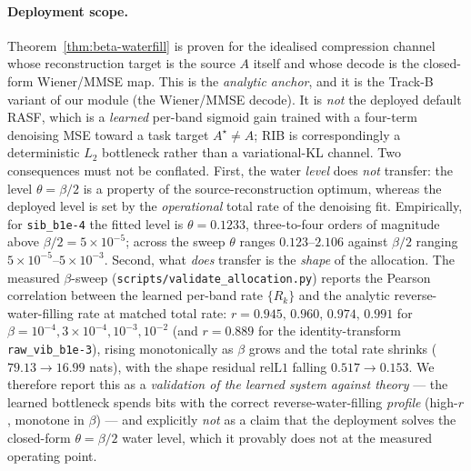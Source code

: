 \paragraph{Deployment scope.}
Theorem~\ref{thm:beta-waterfill} is proven for the idealised compression channel
whose reconstruction target is the source $A$ itself and whose decode is the
closed-form Wiener/MMSE map. This is the \emph{analytic anchor}, and it is the
Track-B variant of our module (the Wiener/MMSE decode). It is \emph{not} the
deployed default RASF, which is a \emph{learned} per-band sigmoid gain trained
with a four-term denoising MSE toward a task target $A^\star\!\neq\!A$; RIB is
correspondingly a deterministic $L_2$ bottleneck rather than a variational-KL
channel. Two consequences must not be conflated. First, the water \emph{level}
does \emph{not} transfer: the level $\theta=\beta/2$ is a property of the
source-reconstruction optimum, whereas the deployed level is set by the
\emph{operational} total rate of the denoising fit. Empirically, for
\texttt{sib\_b1e-4} the fitted level is $\theta=0.1233$, three-to-four orders of
magnitude above $\beta/2=5\times10^{-5}$; across the sweep $\theta$ ranges
$0.123$--$2.106$ against $\beta/2$ ranging $5\times10^{-5}$--$5\times10^{-3}$.
Second, what \emph{does} transfer is the \emph{shape} of the allocation. The
measured $\beta$-sweep (\texttt{scripts/validate\_allocation.py}) reports the
Pearson correlation between the learned per-band rate $\{R_k\}$ and the analytic
reverse-water-filling rate at matched total rate:
$r=0.945,\,0.960,\,0.974,\,0.991$ for
$\beta=10^{-4},3\!\times\!10^{-4},10^{-3},10^{-2}$
(and $r=0.889$ for the identity-transform \texttt{raw\_vib\_b1e-3}), rising
monotonically as $\beta$ grows and the total rate shrinks
($79.13\to16.99$ nats), with the shape residual $\mathrm{relL1}$ falling
$0.517\to0.153$. We therefore report this as a \emph{validation of the learned
system against theory} --- the learned bottleneck spends bits with the correct
reverse-water-filling \emph{profile} (high-$r$, monotone in $\beta$) --- and
explicitly \emph{not} as a claim that the deployment solves the closed-form
$\theta=\beta/2$ water level, which it provably does not at the measured
operating point.

